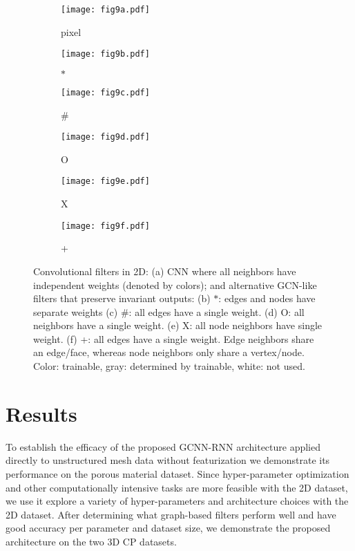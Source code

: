 \documentclass[12pt,reqno]{article}
\newcommand{\ADD}[1]{{#1}}
\begin{document}
\begin{figure}
\centering
\begin{subfigure}[c]{0.3\textwidth}
\texttt{[image: fig9a.pdf]}
\caption{pixel}
\end{subfigure}
\begin{subfigure}[c]{0.3\textwidth}
\texttt{[image: fig9b.pdf]}
\caption{$\ast$}
\end{subfigure}
\begin{subfigure}[c]{0.3\textwidth}
\texttt{[image: fig9c.pdf]}
\caption{\#}
\end{subfigure}
\begin{subfigure}[c]{0.3\textwidth}
\texttt{[image: fig9d.pdf]}
\caption{O}
\end{subfigure}
\begin{subfigure}[c]{0.3\textwidth}
\texttt{[image: fig9e.pdf]}
\caption{X}
\end{subfigure}
\begin{subfigure}[c]{0.3\textwidth}
\texttt{[image: fig9f.pdf]}
\caption{+}
\end{subfigure}
\caption{Convolutional filters in 2D:
(a) CNN where all neighbors have independent weights (denoted by colors); and
alternative GCN-like filters that preserve invariant outputs:
(b) $\ast$: edges and nodes have separate weights
(c) \#: all edges have a single weight.
(d) O: all neighbors have a single weight.
(e) X: all node neighbors have single weight.
(f) +: all edges have a single weight.
Edge neighbors share an edge/face, whereas node neighbors only share a vertex/node.
Color: trainable, gray: determined by trainable, white: not used.
}
\label{fig:filters}
\end{figure}


\section{Results}\label{sec:results}

\ADD{
To establish the efficacy of the proposed GCNN-RNN architecture  applied directly to unstructured mesh data without featurization  we demonstrate its performance on the porous material dataset.
}
Since hyper-parameter optimization and other computationally intensive tasks are more feasible with the 2D dataset, we use it explore a variety of hyper-parameters and architecture choices with the 2D dataset.
After determining what graph-based filters perform well and have good accuracy per parameter and dataset size, we demonstrate the proposed architecture on the two 3D CP datasets.
\end{document}
